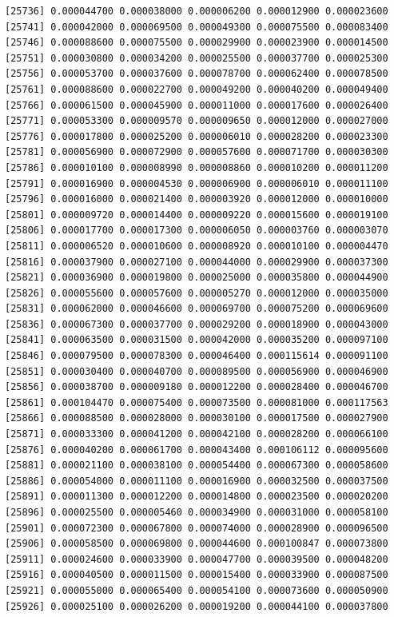 \documentclass[]{article}
\begin{document}
\begin{verbatim}
[25736] 0.000044700 0.000038000 0.000006200 0.000012900 0.000023600
[25741] 0.000042000 0.000069500 0.000049300 0.000075500 0.000083400
[25746] 0.000088600 0.000075500 0.000029900 0.000023900 0.000014500
[25751] 0.000030800 0.000034200 0.000025500 0.000037700 0.000025300
[25756] 0.000053700 0.000037600 0.000078700 0.000062400 0.000078500
[25761] 0.000088600 0.000022700 0.000049200 0.000040200 0.000049400
[25766] 0.000061500 0.000045900 0.000011000 0.000017600 0.000026400
[25771] 0.000053300 0.000009570 0.000009650 0.000012000 0.000027000
[25776] 0.000017800 0.000025200 0.000006010 0.000028200 0.000023300
[25781] 0.000056900 0.000072900 0.000057600 0.000071700 0.000030300
[25786] 0.000010100 0.000008990 0.000008860 0.000010200 0.000011200
[25791] 0.000016900 0.000004530 0.000006900 0.000006010 0.000011100
[25796] 0.000016000 0.000021400 0.000003920 0.000012000 0.000010000
[25801] 0.000009720 0.000014400 0.000009220 0.000015600 0.000019100
[25806] 0.000017700 0.000017300 0.000006050 0.000003760 0.000003070
[25811] 0.000006520 0.000010600 0.000008920 0.000010100 0.000004470
[25816] 0.000037900 0.000027100 0.000044000 0.000029900 0.000037300
[25821] 0.000036900 0.000019800 0.000025000 0.000035800 0.000044900
[25826] 0.000055600 0.000057600 0.000005270 0.000012000 0.000035000
[25831] 0.000062000 0.000046600 0.000069700 0.000075200 0.000069600
[25836] 0.000067300 0.000037700 0.000029200 0.000018900 0.000043000
[25841] 0.000063500 0.000031500 0.000042000 0.000035200 0.000097100
[25846] 0.000079500 0.000078300 0.000046400 0.000115614 0.000091100
[25851] 0.000030400 0.000040700 0.000089500 0.000056900 0.000046900
[25856] 0.000038700 0.000009180 0.000012200 0.000028400 0.000046700
[25861] 0.000104470 0.000075400 0.000073500 0.000081000 0.000117563
[25866] 0.000088500 0.000028000 0.000030100 0.000017500 0.000027900
[25871] 0.000033300 0.000041200 0.000042100 0.000028200 0.000066100
[25876] 0.000040200 0.000061700 0.000043400 0.000106112 0.000095600
[25881] 0.000021100 0.000038100 0.000054400 0.000067300 0.000058600
[25886] 0.000054000 0.000011100 0.000016900 0.000032500 0.000037500
[25891] 0.000011300 0.000012200 0.000014800 0.000023500 0.000020200
[25896] 0.000025500 0.000005460 0.000034900 0.000031000 0.000058100
[25901] 0.000072300 0.000067800 0.000074000 0.000028900 0.000096500
[25906] 0.000058500 0.000069800 0.000044600 0.000100847 0.000073800
[25911] 0.000024600 0.000033900 0.000047700 0.000039500 0.000048200
[25916] 0.000040500 0.000011500 0.000015400 0.000033900 0.000087500
[25921] 0.000055000 0.000065400 0.000054100 0.000073600 0.000050900
[25926] 0.000025100 0.000026200 0.000019200 0.000044100 0.000037800

\end{verbatim}
\end{document}
